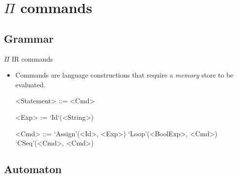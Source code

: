 \documentclass{beamer}
\begin{document}
\section{$\Pi$ commands}

\subsection{Grammar}


\begin{frame}{{\color{red} $\Pi$ IR} commands}

\begin{itemize}
\item Commands are language constructions that require a \emph{memory} store to be evaluated. 
\begin{grammar}
<Statement> ::=  <Cmd> 

<Exp> := `Id`(<String>)

<Cmd>       ::=  `Assign'(<Id>, <Exp>) \alt `Loop'(<BoolExp>, <Cmd>) \alt  `CSeq'(<Cmd>, <Cmd>)
\end{grammar}


\end{itemize}

\end{frame}

\subsection{Automaton}

\end{document}

